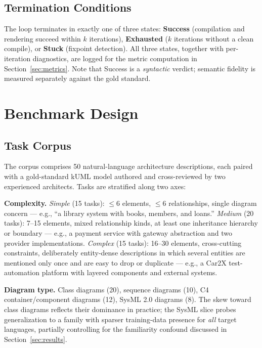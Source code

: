 \documentclass[acmsmall,nonacm]{acmart}
\begin{document}
\subsection{Termination Conditions}

The loop terminates in exactly one of three states: \textbf{Success} (compilation and rendering succeed within $k$ iterations), \textbf{Exhausted} ($k$ iterations without a clean compile), or \textbf{Stuck} (fixpoint detection). All three states, together with per-iteration diagnostics, are logged for the metric computation in Section~\ref{sec:metrics}. Note that Success is a \emph{syntactic} verdict; semantic fidelity is measured separately against the gold standard.

\section{Benchmark Design}
\label{sec:benchmark}

\subsection{Task Corpus}

The corpus comprises 50 natural-language architecture descriptions, each paired with a gold-standard kUML model authored and cross-reviewed by two experienced architects. Tasks are stratified along two axes:

\textbf{Complexity.} \emph{Simple} (15 tasks): $\leq 6$ elements, $\leq 6$ relationships, single diagram concern --- e.g., ``a library system with books, members, and loans.'' \emph{Medium} (20 tasks): 7--15 elements, mixed relationship kinds, at least one inheritance hierarchy or boundary --- e.g., a payment service with gateway abstraction and two provider implementations. \emph{Complex} (15 tasks): 16--30 elements, cross-cutting constraints, deliberately entity-dense descriptions in which several entities are mentioned only once and are easy to drop or duplicate --- e.g., a Car2X test-automation platform with layered components and external systems.

\textbf{Diagram type.} Class diagrams (20), sequence diagrams (10), C4 container/component diagrams (12), SysML 2.0 diagrams (8). The skew toward class diagrams reflects their dominance in practice; the SysML slice probes generalization to a family with sparser training-data presence for \emph{all} target languages, partially controlling for the familiarity confound discussed in Section~\ref{sec:results}.
\end{document}
